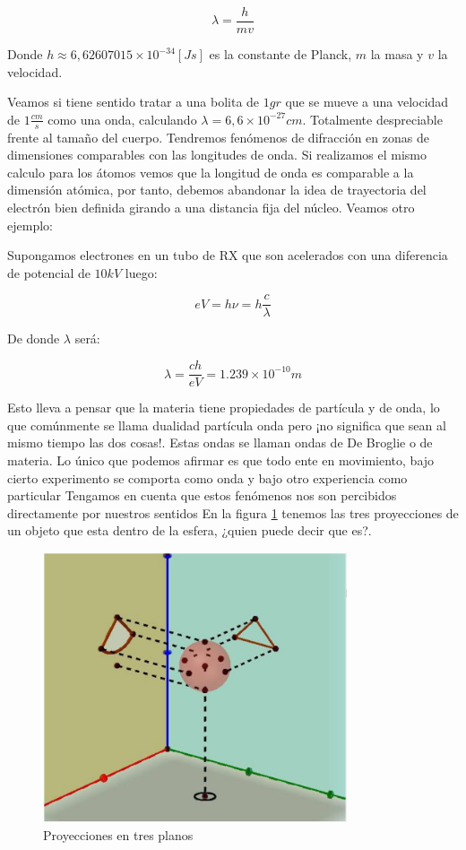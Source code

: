 \begin{equation}
	\lambda=\dfrac{h}{mv}
\end{equation}

Donde $h\approx 6,62607015 \times 10^{-34}\left[ Js\right]$ es la constante de Planck, $m$ la masa y $v$ la velocidad.

Veamos si tiene sentido tratar a una bolita de $1gr$ que se mueve a una velocidad de $1\frac{cm}{s}$ como una onda, calculando $\lambda=6,6\times10^{-27}cm$. Totalmente despreciable frente al tamaño del cuerpo. Tendremos fenómenos de difracción en zonas de dimensiones comparables con las longitudes de onda. Si realizamos el mismo calculo para los átomos vemos que la longitud de onda es comparable a la dimensión atómica, por tanto, debemos abandonar la idea de trayectoria del electrón bien definida girando a una distancia fija del núcleo. Veamos otro ejemplo:

Supongamos electrones en un tubo de RX que son acelerados con una diferencia de potencial de $10kV$ luego:

\begin{equation}
	eV = h \nu = h\dfrac{c}{\lambda}
\end{equation}


De donde $\lambda$ será:

\begin{equation}
	\lambda =\dfrac{ch}{eV} = 1.239\times 10^{-10} m
\end{equation}

Esto lleva a pensar que la materia tiene propiedades de partícula y de onda, lo que comúnmente se llama dualidad partícula onda pero ¡no significa que sean al mismo tiempo las dos cosas!. Estas ondas se llaman ondas de De Broglie o de materia. Lo único que podemos afirmar es que todo ente en
movimiento, bajo cierto experimento se comporta como onda y bajo otro experiencia como particular Tengamos en cuenta que estos fenómenos nos son percibidos directamente por nuestros sentidos En la figura \ref{fig:16} tenemos las tres proyecciones de un objeto que esta dentro de la esfera, ¿quien puede decir que es?. 

\begin{figure}[H]
    \centering
    \includegraphics[width=0.80\textwidth]{./Figures/fig16}
	\caption{Proyecciones en tres planos}
	\label{fig:16}
 \end{figure}


